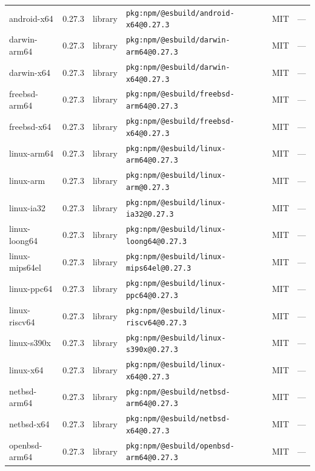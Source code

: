 \documentclass[11pt,a4paper]{article}
\begin{document}
\begin{longtable}{|p{4cm}|p{2cm}|p{1.6cm}|p{5cm}|p{1.5cm}|p{3.5cm}|}
\raggedright android-x64 & 0.27.3 & library & \small\texttt{pkg:npm/@esbuild/android-x64@0.27.3} & MIT & \small — \\
\raggedright darwin-arm64 & 0.27.3 & library & \small\texttt{pkg:npm/@esbuild/darwin-arm64@0.27.3} & MIT & \small — \\
\raggedright darwin-x64 & 0.27.3 & library & \small\texttt{pkg:npm/@esbuild/darwin-x64@0.27.3} & MIT & \small — \\
\raggedright freebsd-arm64 & 0.27.3 & library & \small\texttt{pkg:npm/@esbuild/freebsd-arm64@0.27.3} & MIT & \small — \\
\raggedright freebsd-x64 & 0.27.3 & library & \small\texttt{pkg:npm/@esbuild/freebsd-x64@0.27.3} & MIT & \small — \\
\raggedright linux-arm64 & 0.27.3 & library & \small\texttt{pkg:npm/@esbuild/linux-arm64@0.27.3} & MIT & \small — \\
\raggedright linux-arm & 0.27.3 & library & \small\texttt{pkg:npm/@esbuild/linux-arm@0.27.3} & MIT & \small — \\
\raggedright linux-ia32 & 0.27.3 & library & \small\texttt{pkg:npm/@esbuild/linux-ia32@0.27.3} & MIT & \small — \\
\raggedright linux-loong64 & 0.27.3 & library & \small\texttt{pkg:npm/@esbuild/linux-loong64@0.27.3} & MIT & \small — \\
\raggedright linux-mips64el & 0.27.3 & library & \small\texttt{pkg:npm/@esbuild/linux-mips64el@0.27.3} & MIT & \small — \\
\raggedright linux-ppc64 & 0.27.3 & library & \small\texttt{pkg:npm/@esbuild/linux-ppc64@0.27.3} & MIT & \small — \\
\raggedright linux-riscv64 & 0.27.3 & library & \small\texttt{pkg:npm/@esbuild/linux-riscv64@0.27.3} & MIT & \small — \\
\raggedright linux-s390x & 0.27.3 & library & \small\texttt{pkg:npm/@esbuild/linux-s390x@0.27.3} & MIT & \small — \\
\raggedright linux-x64 & 0.27.3 & library & \small\texttt{pkg:npm/@esbuild/linux-x64@0.27.3} & MIT & \small — \\
\raggedright netbsd-arm64 & 0.27.3 & library & \small\texttt{pkg:npm/@esbuild/netbsd-arm64@0.27.3} & MIT & \small — \\
\raggedright netbsd-x64 & 0.27.3 & library & \small\texttt{pkg:npm/@esbuild/netbsd-x64@0.27.3} & MIT & \small — \\
\raggedright openbsd-arm64 & 0.27.3 & library & \small\texttt{pkg:npm/@esbuild/openbsd-arm64@0.27.3} & MIT & \small — \\

\end{longtable}
\end{document}

